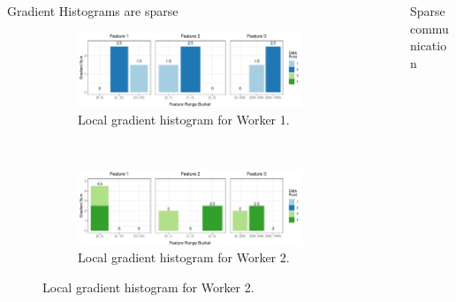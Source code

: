 \documentclass[final]{beamer}
\newlength{\sepwid}
\newlength{\onecolwid}
\begin{document}
\begin{frame}[t]
\begin{columns}[t]
\begin{column}{\onecolwid}
	\begin{block}{Gradient Histograms are sparse}
		\begin{figure}
			\centering
			\begin{subfigure}[t]{\textwidth}
				\centering
				\includegraphics[width=\linewidth]{all-features-grad-rowdist-w1}
				\caption{Local gradient histogram for Worker 1.}
				\label{fig:grad-row-dist-w1}
			\end{subfigure}
			\\
			\begin{subfigure}[t]{\textwidth}
				\centering
				\includegraphics[width=\linewidth]{all-features-grad-rowdist-w2}
				\caption{Local gradient histogram for Worker 2.}
				\label{fig:grad-row-dist-w2}
			\end{subfigure}
		\end{figure}
	\end{block}

	
\end{column} %

\begin{column}{\sepwid}\end{column} %

\begin{column}{\onecolwid} %
	
	\begin{block}{Sparse communication}
		

\end{block}
\end{column}
\end{columns}
\end{frame}
\end{document}
